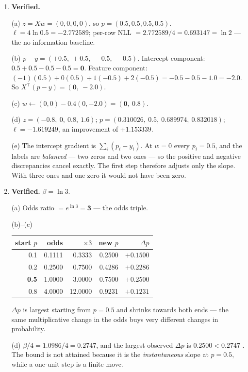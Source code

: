 \documentclass[11pt,a4paper]{article}
\newcommand{\A}[1]{\item[\textbf{#1}]}
\begin{document}
\begin{enumerate}[leftmargin=1.9cm]
\A{U5.62} \textbf{Verified.}
\begin{answerbox}
(a) $z = Xw = (0,0,0,0)$, so $p = (0.5,0.5,0.5,0.5)$.
$\ell = 4\ln 0.5 = \mathbf{-2.772589}$; per-row NLL
$= 2.772589/4 = \mathbf{0.693147} = \ln 2$ --- the no-information baseline.

(b) $p - y = (\mathbf{+0.5},\ +0.5,\ -0.5,\ -0.5)$.
Intercept component: $0.5+0.5-0.5-0.5 = \mathbf{0}$.
Feature component: $(-1)(0.5) + 0(0.5) + 1(-0.5) + 2(-0.5) =
-0.5 - 0.5 - 1.0 = \mathbf{-2.0}$.
So $X^\top(p-y) = \mathbf{(0,\ -2.0)}$.

(c) $w \leftarrow (0,0) - 0.4(0,-2.0) = \mathbf{(0,\ 0.8)}$.

(d) $z = (-0.8,\ 0,\ 0.8,\ 1.6)$;
$p = (\mathbf{0.310026},\ 0.5,\ \mathbf{0.689974},\ \mathbf{0.832018})$;
$\ell = \mathbf{-1.619249}$, an improvement of $\mathbf{+1.153339}$.

(e) The intercept gradient is $\sum_i(p_i - y_i)$. At $w = 0$ every
$p_i = 0.5$, and the labels are \emph{balanced} --- two zeros and two ones ---
so the positive and negative discrepancies cancel exactly. The first step
therefore adjusts only the slope. With three ones and one zero it would not
have been zero.
\end{answerbox}

\A{U5.63} \textbf{Verified.} $\beta = \ln 3$.
\begin{answerbox}
(a) Odds ratio $= e^{\ln 3} = \mathbf{3}$ --- the odds triple.

(b)--(c)
\begin{center}\begin{tabular}{@{}rrrrr@{}}\toprule
start $p$ & odds & $\times 3$ & new $p$ & $\Delta p$\\
\midrule
0.1 & 0.1111 & 0.3333 & 0.2500 & $+0.1500$\\
0.2 & 0.2500 & 0.7500 & 0.4286 & $+0.2286$\\
\textbf{0.5} & 1.0000 & 3.0000 & 0.7500 & $\mathbf{+0.2500}$\\
0.8 & 4.0000 & 12.0000 & 0.9231 & $+0.1231$\\
\bottomrule\end{tabular}\end{center}
$\Delta p$ is largest starting from $p = 0.5$ and shrinks towards both ends ---
the same multiplicative change in the odds buys very different changes in
probability.

(d) $\beta/4 = 1.0986/4 = \mathbf{0.2747}$, and the largest observed
$\Delta p$ is $0.2500 < 0.2747$ \checkmark. The bound is not attained because
it is the \emph{instantaneous} slope at $p = 0.5$, while a one-unit step is a
finite move.


\end{answerbox}
\end{enumerate}
\end{document}
